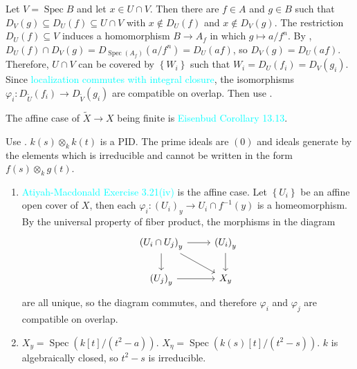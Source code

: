 \begin{exercise}\label{ex3.8}
	Let $V=\operatorname{Spec}B$ and let $x\in U\cap V$. Then there are $f\in A$ and $g\in B$ such that $D_V(g)\subseteq D_U(f)\subseteq U\cap V$ with $x\notin D_U(f)$ and $x\notin D_V(g)$. The restriction $D_U(f)\subseteq V$ induces a homomorphism $B\rightarrow A_f$ in which $g\mapsto a/f^n$. By , $D_U(f)\cap D_V(g)=D_{\operatorname{Spec}\left(A_f\right)}\!\left(a/f^n\right)=D_U(af)$, so $D_V(g)=D_U(af)$. Therefore, $U\cap V$ can be covered by $\left\{W_i\right\}$ such that $W_i=D_U\!\left(f_i\right)=D_V\!\left(g_i\right)$. Since \textcolor{cyan}{localization commutes with integral closure}, the isomorphisms $\varphi_i:D_{\tilde{U}}\!\left(f_i\right)\rightarrow D_{\tilde{V}}\!\left(g_i\right)$ are compatible on overlap. Then use .
	
	The affine case of $\tilde{X}\rightarrow X$ being finite is \textcolor{cyan}{Eisenbud Corollary 13.13}.
\end{exercise}

\begin{exercise}\label{ex3.9}
	Use . $k(s)\otimes_kk(t)$ is a PID. The prime ideals are $(0)$ and ideals generate by the elements which is irreducible and cannot be written in the form $f(s)\otimes_kg(t)$.
\end{exercise}

\begin{exercise}\label{ex3.10}
	\begin{enumerate}[label=(\alph*),ref=\theexercise(\alph*)]
		\item\label{ex3.10.1} \textcolor{cyan}{Atiyah-Macdonald Exercise 3.21(iv)} is the affine case. Let $\left\{U_i\right\}$ be an affine open cover of $X$, then each $\varphi_i:\left(U_i\right)_y\rightarrow U_i\cap f^{-1}(y)$ is a homeomorphism. By the universal property of fiber product, the morphisms in the diagram
		\begin{equation*}
			\begin{tikzcd}
				\left(U_i\cap U_j\right)_y\arrow[r]\arrow[d]\arrow[rd]&\left(U_i\right)_y\arrow[d]\\
				\left(U_j\right)_y\arrow[r]&X_y
			\end{tikzcd}
		\end{equation*}
		are all unique, so the diagram commutes, and therefore $\varphi_i$ and $\varphi_j$ are compatible on overlap.
		\item\label{ex3.10.2} $X_y=\operatorname{Spec}\!\left(k[t]/\!\left(t^2-a\right)\right)$. $X_\eta=\operatorname{Spec}\!\left(k(s)[t]/\!\left(t^2-s\right)\right)$. $k$ is algebraically closed, so $t^2-s$ is irreducible.
	\end{enumerate}
\end{exercise}

